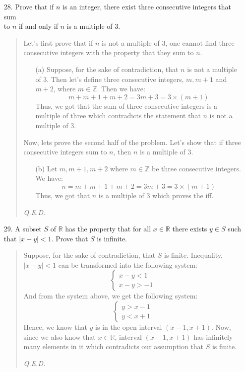 \documentclass[12pt, a4paper]{article}                      %
\begin{document}
\begin{enumerate}
\item[28.]
Prove that if $n$ is an integer, there exist three consecutive integers that sum\\
to $n$ if and only if $n$ is a multiple of 3.
\begin{quote}
Let's first prove that if $n$ is not a multiple of 3, one cannot find
three consecutive integers with the property that they sum to $n$.
\begin{itemize}
\item[(a)]
Suppose, for the sake of contradiction, that $n$ is not a multiple of 3.
Then let's define three consecutive integers, $m, m + 1$ and $m + 2$, where $m \in \mathbb{Z}$.
Then we have:
$$
m + m + 1 + m + 2 = 3m + 3 = 3 \times (m + 1)
$$
Thus, we got that the sum of three consecutive integers is a multiple of three
which contradicts the statement that $n$ is not a multiple of 3.
\end{itemize}
Now, lets prove the second half of the problem. Let's show that
if three consecutive integers sum to $n$, then $n$ is a multiple
of 3.
\begin{itemize}
\item[(b)]
Let $m, m+1, m+2$ where $m \in \mathbb{Z}$ be three consecutive integers.
We have:
$$
n = m + m + 1 + m + 2 = 3m + 3 = 3\times(m+1)
$$
Thus, we got that $n$ is a multiple of 3 which proves the iff.
\end{itemize}
\begin{flushright}
\textit{Q.E.D.}
\end{flushright}
\end{quote}


\item[29.]
A subset $S$ of $\mathbb{R}$ has the property that for all $x \in \mathbb{R}$
there exists $y \in S$ such that $|x - y| < 1$. Prove that $S$ is infinite.

\begin{quote}
Suppose, for the sake of contradiction, that $S$ is finite.
Inequality, $|x - y| < 1$ can be transformed into the following system:
$$
\begin{cases}
x - y < 1\\
x - y > -1
\end{cases}
$$
And from the system above, we get the following system:
$$
\begin{cases}
y > x - 1\\
y < x + 1
\end{cases}
$$
Hence, we know that $y$ is in the open interval $(x-1, x+1)$.
Now, since we also know that $x \in \mathbb{R}$, interval $(x-1, x+1)$
has infinitely many elements in it which contradicts our assumption
that $S$ is finite.
\begin{flushright}
\textit{Q.E.D.}
\end{flushright}
\end{quote}

\end{enumerate}
\end{document}
